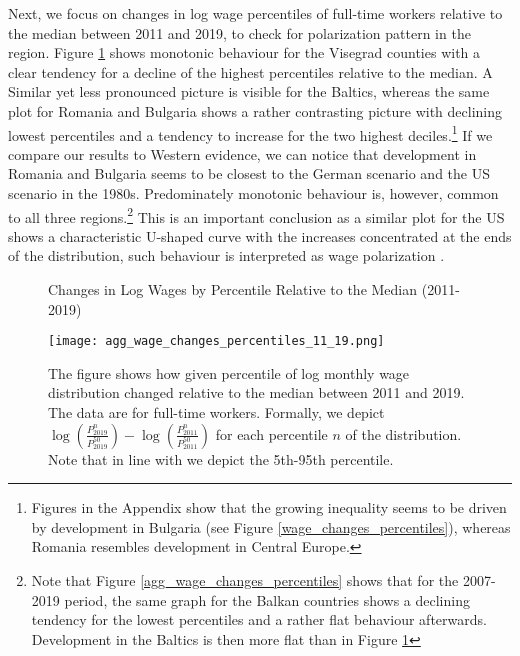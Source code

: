 \documentclass[11pt]{article}
\begin{document}
Next, we focus on changes in log wage percentiles of full-time workers relative to the median between 2011 and 2019, to check for polarization pattern in the region. Figure \ref{agg_wage_changes_percentiles_11_19} shows monotonic behaviour for the Visegrad counties with a clear tendency for a decline of the highest percentiles relative to the median. A Similar yet less pronounced picture is visible for the Baltics, whereas the same plot for Romania and Bulgaria shows a rather contrasting picture with declining lowest percentiles and a tendency to increase for the two highest deciles.\footnote{Figures in the Appendix show that the growing inequality seems to be driven by development in Bulgaria (see Figure \ref{wage_changes_percentiles}), whereas Romania resembles development in Central Europe.} If we compare our results to Western evidence, we can notice that development in Romania and Bulgaria seems to be closest to the German scenario and the US scenario in the 1980s. Predominately monotonic behaviour is, however, common to all three regions.\footnote{Note that Figure \ref{agg_wage_changes_percentiles} shows that for the 2007-2019 period, the same graph for the Balkan countries shows a declining tendency for the lowest percentiles and a rather flat behaviour afterwards. Development in the Baltics is then more flat than in Figure \ref{agg_wage_changes_percentiles_11_19}} This is an important conclusion as a similar plot for the US shows a characteristic U-shaped curve with the increases concentrated at the ends of the distribution, such behaviour is interpreted as wage polarization \citep{acemoglu2011skills}. 

\begin{figure}[!htbp]%
    \centering
    \caption{Changes in Log Wages by Percentile Relative to the Median (2011-2019)}
    {\texttt{[image: agg\_wage\_changes\_percentiles\_11\_19.png]} }
    \label{agg_wage_changes_percentiles_11_19}
    \caption*{\footnotesize The figure shows how given percentile of log monthly wage distribution changed relative to the median between 2011 and 2019. The data are for full-time workers. Formally, we depict $\log(\frac{P_{2019}^{n}}{P_{2019}^{50}}) - \log(\frac{P_{2011}^{n}}{P_{2011}^{50}})$ for each percentile $n$ of the distribution. Note that in line with \citet{acemoglu2011skills} we depict the 5th-95th percentile.} 
\end{figure}
\end{document}
